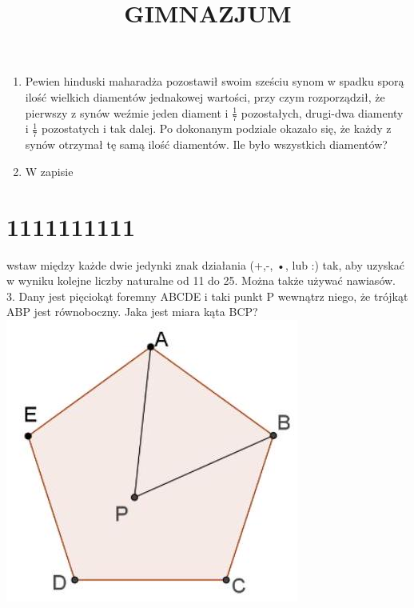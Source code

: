 \documentclass[10pt]{article}
\title{GIMNAZJUM }
\author{}
\date{}
\begin{document}
\maketitle
\begin{enumerate}
  \item Pewien hinduski maharadża pozostawił swoim sześciu synom w spadku sporą ilość wielkich diamentów jednakowej wartości, przy czym rozporządził, że pierwszy z synów weźmie jeden diament i \(\frac{1}{7}\) pozostałych, drugi-dwa diamenty i \(\frac{1}{7}\) pozostatych i tak dalej. Po dokonanym podziale okazało się, że każdy z synów otrzymał tę samą ilość diamentów. Ile było wszystkich diamentów?
  \item W zapisie
\end{enumerate}

\section*{1111111111}
wstaw między każde dwie jedynki znak działania (+,-, •, lub :) tak, aby uzyskać w wyniku kolejne liczby naturalne od 11 do 25. Można także używać nawiasów.\\
3. Dany jest pięciokąt foremny ABCDE i taki punkt P wewnątrz niego, że trójkąt ABP jest równoboczny. Jaka jest miara kąta BCP?\\
\includegraphics[max width=\textwidth, center]{2024_11_21_7659696efc23f57a9a9ag-1}
\end{document}
